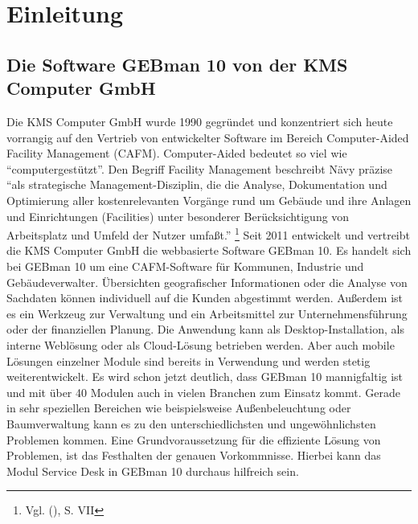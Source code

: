 \section{Einleitung}

\subsection{Die Software GEBman 10 von der KMS Computer GmbH}
\noindent
Die KMS Computer GmbH wurde 1990 gegründet und konzentriert sich heute vorrangig auf den Vertrieb von entwickelter Software im Bereich Computer-Aided Facility Management (CAFM).
Computer-Aided bedeutet so viel wie \enquote{computergestützt}. Den Begriff Facility Management beschreibt Nävy präzise 
\enquote{als strategische Management-Disziplin, die die Analyse, Dokumentation und Optimierung aller kostenrelevanten Vorgänge rund um Gebäude und ihre Anlagen und Einrichtungen (Facilities) unter besonderer Berücksichtigung von Arbeitsplatz und Umfeld der Nutzer umfaßt.} \footnote{Vgl. \citeauthor{Naevy} (\citeyear{Naevy}), S. VII}
\noindent
Seit 2011 entwickelt und vertreibt die KMS Computer GmbH die webbasierte Software GEBman 10. Es handelt sich bei GEBman 10 um eine CAFM-Software für Kommunen, Industrie und Gebäudeverwalter. Übersichten geografischer Informationen oder die Analyse von Sachdaten können individuell auf die Kunden abgestimmt werden. Außerdem ist es ein Werkzeug zur Verwaltung und ein Arbeitsmittel zur Unternehmensführung oder der finanziellen Planung. Die Anwendung kann als Desktop-Installation, als interne Weblösung oder als Cloud-Lösung betrieben werden. Aber auch mobile Lösungen einzelner Module sind bereits in Verwendung und werden stetig weiterentwickelt. Es wird schon jetzt deutlich, dass GEBman 10 mannigfaltig ist und mit über 40 Modulen auch in vielen Branchen zum Einsatz kommt.
Gerade in sehr speziellen Bereichen wie beispielsweise Außenbeleuchtung oder Baumverwaltung kann es zu den unterschiedlichsten und ungewöhnlichsten Problemen kommen. Eine Grundvoraussetzung  für die effiziente Lösung von Problemen, ist das Festhalten der genauen Vorkommnisse. Hierbei kann das Modul Service Desk in GEBman 10 durchaus hilfreich sein.



